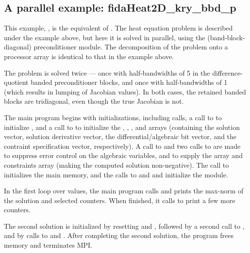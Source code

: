

\subsection{A parallel example: fidaHeat2D\_kry\_bbd\_p}\label{ss:fidaHeat2D_bbd_p}

This example, , is the {\F} equivalent of
.  The heat equation problem is described
under the  example above, but here it is solved in
parallel, using the {\idabbdpre} (band-block-diagonal) preconditioner
module.  The decomposition of the problem onto a processor array is
identical to that in the  example above.

The problem is solved twice --- once with half-bandwidths of 5 in the
difference-quotient banded preconditioner blocks, and once with
half-bandwidths of 1 (which results in lumping of Jacobian values).
In both cases, the retained banded blocks are tridiagonal, even though
the true Jacobian is not.

The main program begins with initializations, including {\mpi} calls,
a call to  to initialize {\nvecp}, and a call to
 to initialize the , , , and
 arrays (containing the solution vector, solution derivative vector,
the differential/algebraic bit vector, and the contraint specification
vector, respectively).  A call to  and two calls to
 are made to suppress error control on the algebraic
variables, and to supply the  array and constraints array (making
the computed solution non-negative).  The call to 
initializes the {\fida} main memory, and the calls to  and
 and initialize the {\fidabbd} module.

In the first loop over  values, the main program calls 
and prints the max-norm of the solution and selected counters.  When finished,
it calls  to print a few more counters.

The second solution is initialized by resetting  and ,
followed by a second call to , and by calls to  
and .  After completing the second solution, the
program frees memory and terminates MPI.

